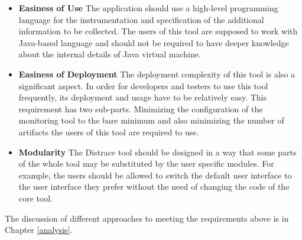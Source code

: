 \begin{itemize}
	\item \textbf{Easiness of Use} \newline
	The application should use a high-level programming language for the instrumentation and specification of the additional information to be collected. The users of this tool are supposed to work with Java-based language and should not be required to have deeper knowledge about the internal details of Java virtual machine.
	\item \textbf{Easiness of Deployment} \newline
	The deployment complexity of this tool is also a significant aspect. In order for developers and testers to use this tool frequently, its deployment and usage have to be relatively easy. This requirement has two sub-parts. Minimizing the configuration of the monitoring tool to the bare minimum and also minimizing the number of artifacts the users of this tool are required to use.
	\item \textbf{Modularity} \newline
	The Distrace tool should be designed in a way that some parts of the whole tool may be substituted by the user specific modules. For example, the users should be allowed to switch the default user interface to the user interface they prefer without the need of changing the code of the core tool.
\end{itemize}

The discussion of different approaches to meeting the requirements above is in Chapter \ref{analysis}.

